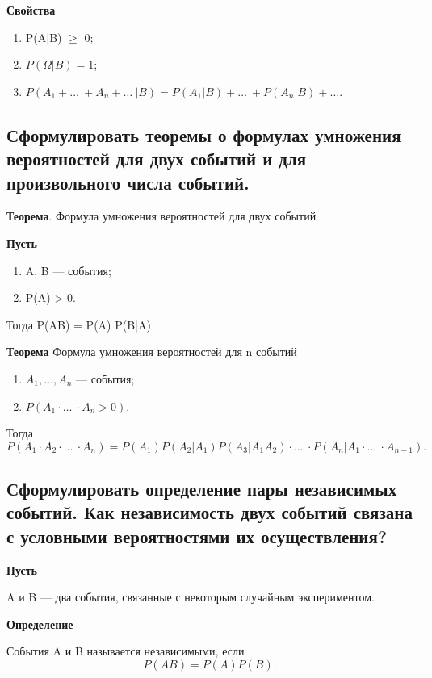 \textbf{Свойства}

\begin{enumerate}
	\item P(A|B) $\geqslant$ 0;
	\item $P(\Omega|B) = 1$;
	\item $P(A_1 + \dots\ + A_n + \dots\ | B) = P(A_1|B) + \dots\ + P(A_n|B) + \dots$.
\end{enumerate}

\subsection{Сформулировать теоремы о формулах умножения вероятностей для двух событий и для произвольного числа событий.}

\textbf{Теорема}. Формула умножения вероятностей для двух событий 

\textbf{Пусть}

\begin{enumerate}
	\item A, B --- события;
	\item P(A) > 0.
\end{enumerate}

Тогда P(AB) = P(A) P(B|A)

\textbf{Теорема} Формула умножения вероятностей для n событий

\begin{enumerate}
	\item $A_1, \dots, A_n$ --- события;
	\item $P(A_1 \cdot \dots\ \cdot A_n > 0)$.
\end{enumerate}
Тогда 
\begin{equation}
	P(A_1 \cdot A_2 \cdot \dots\ \cdot A_n)  = P(A_1) P(A_2 | A_1)P(A_3|A_1A_2) \cdot \dots\ \cdot P(A_n|A_1 \cdot \dots\ \cdot  A_{n-1}).
\end{equation}

\subsection{Сформулировать определение пары независимых событий. Как независимость двух событий связана с условными вероятностями их осуществления?}

\textbf{Пусть}

A и B --- два события, связанные с некоторым случайным экспериментом.

\textbf{Определение}

События A и B называется независимыми, если
\begin{equation}
	P(AB) = P(A) P(B).
\end{equation} 

